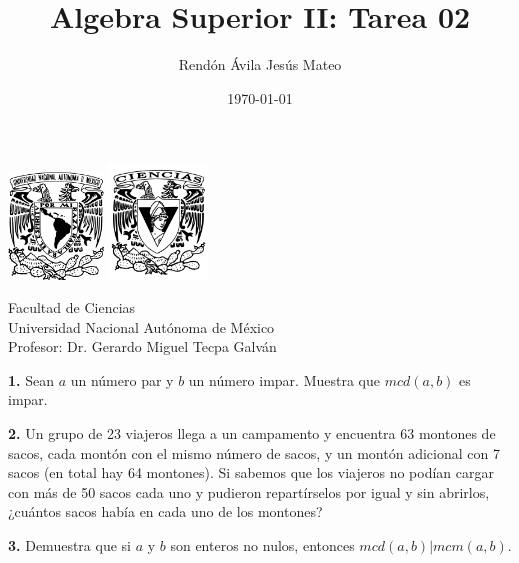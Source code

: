 \documentclass[12pt]{article}
\title{\textbf{Algebra Superior II: Tarea 02}}
\author{Rendón Ávila Jesús Mateo}
\date{\today}
\begin{document}
\maketitle
\begin{center}
\vspace{2cm}
\includegraphics[width=0.19\textwidth]{Escudo.png}
\hspace{0.5cm}
\includegraphics[width=0.2\textwidth]{logo_ciencias.png}
\end{center}
\begin{center}
    \vspace{1cm}
    Facultad de Ciencias\\
    Universidad Nacional Autónoma de México\\
    \vspace{3cm}
    Profesor: Dr. Gerardo Miguel Tecpa Galván\\
\end{center}

\newpage

%
%
\textbf{1.} Sean $a$ un número par y $b$ un número impar. Muestra que $mcd(a, b)$ es impar.

\vspace{1cm}

%
%
\textbf{2.} Un grupo de 23 viajeros llega a un campamento y encuentra 63 montones de sacos, cada montón con
el mismo número de sacos, y un montón adicional con 7 sacos (en total hay 64 montones). Si sabemos que
los viajeros no podían cargar con más de 50 sacos cada uno y pudieron repartírselos por igual y sin abrirlos,
¿cuántos sacos había en cada uno de los montones?

\vspace{1cm}

%
%
\textbf{3.} Demuestra que si $a$ y $b$ son enteros no nulos, entonces $mcd(a, b) |mcm(a, b)$.
\end{document}
